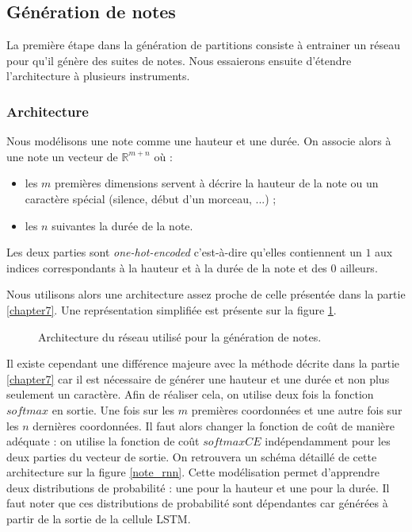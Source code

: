 \subsection{Génération de notes}

La première étape dans la génération de partitions consiste à entrainer un réseau pour qu'il génère des suites de notes. Nous essaierons ensuite d'étendre l'architecture à plusieurs instruments.

\subsubsection{Architecture}

Nous modélisons une note comme une hauteur et une durée. On associe alors à une note un vecteur de $\mathbb{R}^{m+n}$ où :
\begin{itemize}
\item les $m$ premières dimensions servent à décrire la hauteur de la note ou un caractère spécial (silence, début d'un morceau, ...) ;
\item les $n$ suivantes la durée de la note.
\end{itemize}
Les deux parties sont \textit{one-hot-encoded} c'est-à-dire qu'elles contiennent un $1$ aux indices correspondants à la hauteur et à la durée de la note et des $0$ ailleurs.

Nous utilisons alors une architecture assez proche de celle présentée dans la partie \ref{chapter7}. Une représentation simplifiée est présente sur la figure \ref{note_rnn_simplified}.

\begin{figure}[h!]
\begin{center}

\caption{Architecture du réseau utilisé pour la génération de notes.}
\label{note_rnn_simplified}
\end{center}
\end{figure}

Il existe cependant une différence majeure avec la méthode décrite dans la partie \ref{chapter7} car il est nécessaire de générer une hauteur et une durée et non plus seulement un caractère. Afin de réaliser cela, on utilise deux fois la fonction $softmax$ en sortie. Une fois sur les $m$ premières coordonnées et une autre fois sur les $n$ dernières coordonnées. Il faut alors changer la fonction de coût de manière adéquate : on utilise la fonction de coût $softmaxCE$ indépendamment pour les deux parties du vecteur de sortie. On retrouvera un schéma détaillé de cette architecture sur la figure \ref{note_rnn}. Cette modélisation permet d'apprendre deux distributions de probabilité : une pour la hauteur et une pour la durée. Il faut noter que ces distributions de probabilité sont dépendantes car générées à partir de la sortie de la cellule LSTM.

